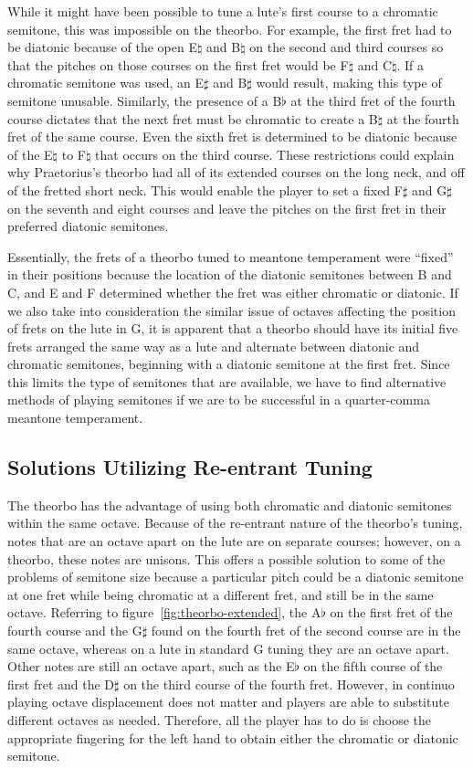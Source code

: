 While it might have been possible to tune a lute's first course to a chromatic semitone,
this was impossible on the theorbo. For example, the first fret had to be diatonic because
of the open E$\natural$ and B$\natural$ on the second and third courses so that the
pitches on those courses on the first fret would be F$\natural$ and C$\natural$.  If a
chromatic semitone was used, an E$\sharp$ and B$\sharp$ would result, making this type of
semitone unusable. Similarly, the presence of a B$\flat$ at the third fret of the fourth
course dictates that the next fret must be chromatic to create a B$\natural$ at the fourth
fret of the same course. Even the sixth fret is determined to be diatonic because of the
E$\natural$ to F$\natural$ that occurs on the third course.  These restrictions could
explain why Praetorius's theorbo had all of its extended courses on the long neck, and
off of the fretted short neck.  This would enable the player to set a fixed F$\sharp$ and 
G$\sharp$ on the seventh and eight courses and leave the pitches on the first fret in
their preferred diatonic semitones. 

Essentially, the frets of a theorbo tuned to meantone temperament were ``fixed'' in
their positions because the location of the diatonic semitones between B and C, and E
and F determined whether the fret was either chromatic or diatonic.  If we also take into
consideration the similar issue of octaves affecting the position of frets on the lute
in G, it is apparent that a theorbo should have its initial five frets arranged the
same way as a lute and alternate between diatonic and chromatic semitones, beginning
with a diatonic semitone at the first fret.  Since this limits the type of semitones
that are available, we have to find alternative methods of playing semitones if we are
to be successful in a quarter-comma meantone temperament.

\subsection{Solutions Utilizing Re-entrant Tuning}

The theorbo has the advantage of using both chromatic and diatonic semitones within
the same octave.  Because of the re-entrant nature of the theorbo's tuning, notes that
are an octave apart on the lute are on separate courses; however, on a theorbo, these
notes are unisons. This offers a possible solution to some of the problems of semitone
size because a particular pitch could be a diatonic semitone at one fret while being
chromatic at a different fret, and still be in the same octave. Referring to
figure~\ref{fig:theorbo-extended}, the A$\flat$ on the first fret of the fourth course
and the G$\sharp$ found on the fourth fret of the second course are in the same octave,
whereas on a lute in standard G tuning they are an octave apart. Other notes are still
an octave apart, such as the E$\flat$ on the fifth course of the first fret and the
D$\sharp$ on the third course of the fourth fret.  However, in continuo playing octave
displacement does not matter and players are able to substitute different
octaves as needed. Therefore, all the player has to do is choose the appropriate
fingering for the left hand to obtain either the chromatic or diatonic semitone.

